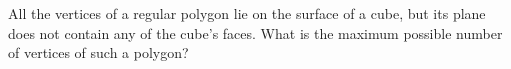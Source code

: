 \problem
All the vertices of a regular polygon lie on the surface of a cube, but its plane does not contain any of the cube's faces. 
What is the maximum possible number of vertices of such a polygon?
\solution
\endproblem
